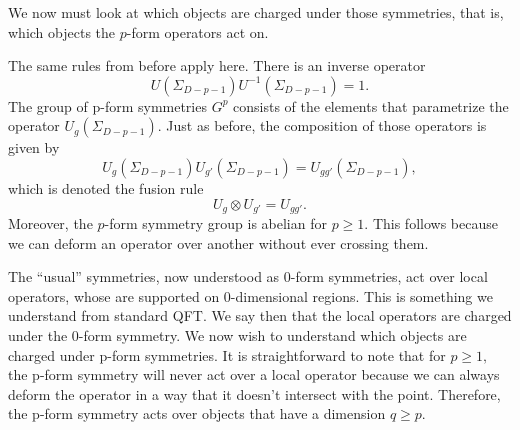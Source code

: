 \documentclass{article}
\begin{document}
We now must look at which objects are charged under those symmetries, that is, which objects the $p$-form operators act on.

The same rules from before apply here. There is an inverse operator
$$
U(\Sigma_{D-p-1})U^{-1}(\Sigma_{D-p-1})=1.
$$
The group of p-form symmetries $G^{p}$  consists of the elements that parametrize the operator $U_g(\Sigma_{D-p-1}).$ Just as before, the composition of those operators is given by  
$$
U_g(\Sigma_{D-p-1})U_{g'}(\Sigma_{D-p-1})=U_{gg'}(\Sigma_{D-p-1}),
$$
which is denoted the fusion rule 
$$
U_g\otimes U_{g'}=U_{gg'}.
$$
Moreover, the $p$-form symmetry group is abelian for $p\ge 1.$ This follows because we can deform an operator over another without ever crossing them. 

The “usual” symmetries, now understood as 0-form symmetries, act over local operators, whose are supported on 0-dimensional regions. This is something we understand from standard QFT. We say then that the local operators are charged under the 0-form symmetry. We now wish to understand which objects are charged under p-form symmetries. It is straightforward to note that for $p\geq1,$ the p-form symmetry will never act over a local operator because we can always deform the operator in a way that it doesn’t intersect with the point. Therefore, the p-form symmetry acts over objects that have a dimension $q\geq p$.
\end{document}
